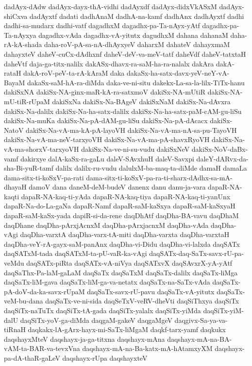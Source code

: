 {dadAyx-dAdw
dadAyx-dayx-thA-vidhi
dadAyxdf
dadAyx-didxVkASxM
dadAyx-shiCxva
dadAyxtf
dadati
dadhAnaM
dadhA-na-kamf
dadhAnx
dadhAyxtf
dadhi
dadhi-sa-mudarx
dadhi-vatf
dagadhxM
dagadhx-pa-Ta-nAyx-yAtf
dagadhx-pa-Ta-nAyxya
dagadhx-vAda
dagadhx-vA-yitutx
dagudhxM
dahana
dahanaM
daha-rA-kA-shada
daha-roV-pA-sa-nA-dhAyxyeV
daharxM
dahateV
dahayxmaM
dahayxteV
daheV-cuCx-dAdhxnf
daheV-deV-va-meV-tatf
daheVdf
daheV-tatxtaH
daheVtf
daja-ga-titx-nalilx
dakASx-dhavx-ra-saM-ha-ra-nalalx
dakAra
dakA-rataH
dakA-roV-peV-ta-rA-kAraM
daka
dakaSx-ha-satx-davx-yeV-neY-vA-BayaM
dakaSx-saM-hA-ra-diMda
daka-ve-ni-situ
dakekx-La-sa-la-lilx-TiTx-hanu
dakiSxNA
dakiSx-NA-ginx-maR-kA-ra-satxmoV
dakiSx-NA-mUtiR
dakiSx-NA-mU-tiR-rUpaM
dakiSxNa
dakiSx-Na-BAgeV
dakiSxNaM
dakiSx-Na-dAvxra
dakiSx-Na-dalilx
dakiSx-Na-ha-satx-dalilx
dakiSx-Na-ha-satx-paM-cAM-gu-liSu
dakiSx-Na-muKa
dakiSx-Na-pA-dAM-gu-liSu
dakiSx-Na-pA-dAcacx
dakiSx-NatoV
dakiSx-Na-vA-ma-kA-pA-layoVH
dakiSx-Na-vA-ma-nA-sa-pu-TayoVH
dakiSx-Na-vA-ma-neV-tarxyoVH
dakiSx-Na-vA-ma-pA-shavxRyoVH
dakiSx-Na-vA-ma-shorxV-tarxyoVH
dakiSx-Na-ve-ni-su-vudu
dakiSxNeV
dakiSx-NoV-daBx-vamf
dakirxye
dalA-kaSx-ra-gaLu
daleV-SAvxhuH
daleV-Savxpi
daleY-dARvx-da-sha-Bi-yuR-tamf
dalilx
dalilx-ru-vudu
dalulxM-ba-maq-ta-diMde
damaH
damaLa
dama-sitx-ti-koSxV-pa-rati
dama-sitx-ti-koSxV-pa-ra-ti-sharx-dAdhx-sa-mA-dhayaH
damoV
dana
daneM-deM-budeV
danenx
danu
danu-ja-vara
dapaR-NA-kaqti
dapaR-NA-kaq-ti-yAda
dapaR-NA-kaq-tiya
dapaR-NA-kaq-ti-yanUnx
dapaR-Na-do-La-gaNa
dapaR-Namf
dapaR-saM-kaSxya
dapaR-saM-kaSxyaH
dapaR-saM-kaSx-yada
dapiR-si-da-rene
daqDhAtf
daqDha-BA-vavu
daqDhaM
daqDhane
daqDha-pArxjAcnxM
daqDha-pArxjacnxM
daqDha-vAda
daqDha-vAgi
daqDha-varxtA
daqDha-varx-tA-miti
daqDha-varxta
daqDha-varxtaH
daqDha-veY-rA-gayx-saM-panAnx
daqDha-vi-Didu
daqDha-vi-lalxda
daqSATx
daqSATxM-tada
daqSATxM-ta-pU-vaR-ka-vAgi
daqSATx-daq-SaTx-savx-rU-pa-veMdu
daqSATx-piRta
daqSATx-vA-niVya
daqSATxvX
daqSAvxrX-yA-yAtf
daqSaThx-Pa-laM-gaLaM
daqSaTx
daqSaTxM
daqSaTx-dalilx
daqSaTx-liMga
daqSaTx-liM-gava
daqSaTx-liM-ga-va-netatx
daqSaTx-na-SaTx-vAda
daqSaTx-pA-doV-da-ka-savx-rUpaM
daqSaTx-savx-rU-pavu
daqSaTx-vA-yitutx
daqSaTx-veM-bu-dana
daqSaTx-ve-ni-sida
daqSeTxV-veRV-dheVti
daqSiThxya
daqSiTx
daqSiTx-naTuTx
daqSiTx-tA-gada
daqSiTx-yalalx
daqSiTx-yiMda
daqSiTx-yiM-dalU
daqSiTx-yoV-ga-diMda
daqgaM-gakeV
daqgaMgeV
daqgivx-Sa-ya-va-tiRnaH
daqkakx-lA-gArx-hayx-mi-SaTx-liMgaM
daqkf-tarx-yamf
daqkukx
daqshayxMteV
daqshayx-ja-ga-titxna
daqshayx-mAna
daqshayx-mA-na-BA-vAM-ta-BAR-va-tevxVna
daqshayx-mA-na-Ba-katx-mA-hAtamxyXM
daqshayx-pa-dA-thaR-gaLeV
daqshayx-rUpa
daqshayxteV
}
